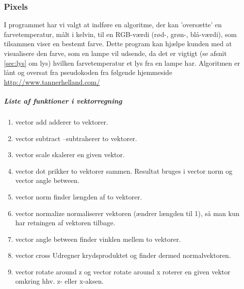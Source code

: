 \subsubsection{Pixels}
I programmet har vi valgt at indføre en algoritme, der kan ’oversætte’ en farvetemperatur, målt i kelvin, til en RGB-værdi (rød-, grøn-, blå-værdi), som tilsammen viser en bestemt farve. Dette program kan hjælpe kunden med at visualisere den farve, som en lampe vil udsende, da det er vigtigt (se afsnit \ref{sec:lys} om lys) hvilken farvetemperatur et lys fra en lampe har. Algoritmen er lånt og oversat fra pseudokoden fra følgende hjemmeside \href{http://www.tannerhelland.com/4435/convert-temperature-rgb-algorithm-code/}{http://www.tannerhelland.com/}






\subparagraph{Liste af funktioner i vektorregning}
\begin{enumerate}

  \item vector add adderer to vektorer.
  \item vector subtract –subtraherer to vektorer.
  \item vector scale skalerer en given vektor.
  \item vector dot prikker to vektorer sammen. Resultat bruges i vector norm og vector angle between.
  \item vector norm finder længden af to vektorer.
  \item vector normalize normaliserer vektoren (ændrer længden til 1), så man kun har retningen af vektoren tilbage.
  \item vector angle between finder vinklen mellem to vektorer.
  \item vector cross Udregner krydsproduktet og finder dermed normalvektoren.
  \item vector rotate around z og vector rotate around x roterer en given vektor omkring hhv. z- eller x-aksen.

\end{enumerate}
